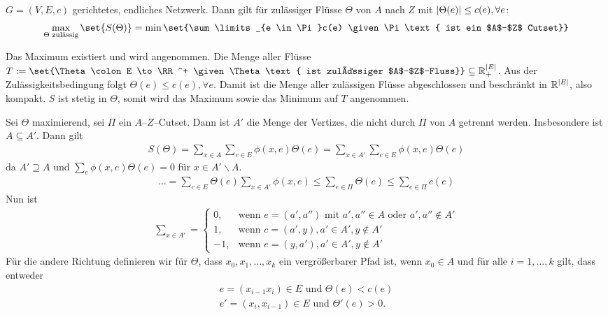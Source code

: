 \begin{satz}
	\label{satz:5-3}
	$G = (V,E,c)$ gerichtetes, endliches Netzwerk. Dann gilt für zulässiger Flüsse $\Theta$ von $A$ nach $Z$ mit $\lvert\Theta(e)\rvert  \leq c(e), \forall e$:
	\begin{align}
		\max\limits_{\Theta \text{ zulässig}}\set{S(\Theta)}  = \min\set{\sum\limits_{e \in \Pi}c(e) \given \Pi \text{ ist ein $A$--$Z$ Cutset}}
	\end{align}
\end{satz}
\begin{beweis}
	Das Maximum existiert und wird angenommen. Die Menge aller Flüsse $T := \set{\Theta \colon E \to \RR^+ \given \Theta \text{ ist zulässiger $A$--$Z$--Fluss}}\subseteq \RR_+^{\abs{E}}$. Aus der Zulässigkeitsbedingung folgt $\Theta(e) \leq c(e), \forall e$. Damit ist die Menge aller zulässigen Flüsse abgeschlossen und beschränkt in $\mathbb{R}^{\lvert E\rvert}$, also kompakt. $S$ ist stetig in $\Theta$, somit wird das Maximum sowie das Minimum auf $T$ angenommen. 
	
	Sei $\Theta$ maximierend, sei $\Pi$ ein $A$--$Z$--Cutset. Dann ist $A'$ die Menge der Vertizes, die nicht durch  $\Pi$ von $A$ getrennt werden. Insbesondere ist $A \subseteq A'$. Dann gilt
	\begin{align}
		S(\Theta) = \sum\limits_{x \in A}\sum\limits_{c \in E} \phi(x,e) \Theta(e) = \sum\limits_{x \in A'} \sum\limits_{c \in E} \phi(x,e) \Theta(e)
	\end{align}
	da $A' \supseteq A$ und $\sum\limits_{e} \phi (x,e) \Theta(e) = 0$ für $x \in A' \backslash A.$
	\begin{align}
		\dots = \sum\limits_{c \in E}\Theta(e)\sum\limits_{x\in A'}\phi(x,e) \leq \sum\limits_{e \in \Pi} \Theta(e) \leq \sum\limits_{e \in \Pi} c(e)
	\end{align}
	Nun ist
	\begin{align}
		\sum\limits_{x \in A'} = 
			\begin{cases}
			0, & \text{wenn } e = (a',a'') \text{ mit } a',a'' \in A \text{ oder } a',a'' \notin A' \\
			1, & \text{wenn } c = (a',y), a' \in A', y\notin A'\\
			-1, & \text{wenn } e= (y,a'), a' \in A', y \notin A'
			\end{cases}
	\end{align}
	Für die andere Richtung definieren wir für $\Theta$, dass $x_0,x_1, \dots , x_k$ ein vergrößerbarer Pfad ist, wenn $x_0 \in A$ und für alle $i = 1,\dots,k$ gilt, dass entweder
	\begin{align}
		e = (x_{i-1}x_i) \in E \text{ und } \Theta(e) < c(e) \\
		e' = (x_i,x_{i-1}) \in E \text{ und } \Theta'(e) > 0.
	\end{align}
	

\end{beweis}
